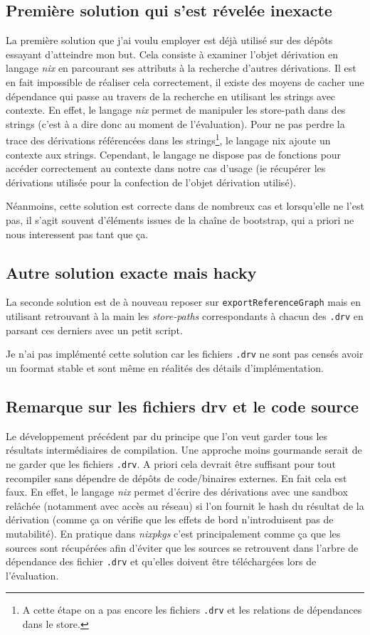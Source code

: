 \documentclass[a4paper,12pt]{article}
\begin{document}
\subsection{Première solution qui s'est révelée inexacte}

La première solution que j'ai voulu employer est déjà utilisé sur des dépôts
essayant d'atteindre mon but. Cela consiste à examiner l'objet dérivation en
langage \emph{nix} en parcourant ses attributs à la recherche d'autres
dérivations. Il est en fait impossible de réaliser cela correctement, il existe
des moyens de cacher une dépendance qui passe au travers de la recherche en
utilisant les strings avec contexte. En effet, le langage \emph{nix} permet de
manipuler les store-path dans des strings (c'est à a dire donc au moment de
l'évaluation). Pour ne pas perdre la trace des dérivations référencées dans les
strings\footnote{A cette étape on a pas encore les fichiers \texttt{.drv} et les
relations de dépendances dans le store.}, le langage nix ajoute un contexte aux
strings. Cependant, le langage ne dispose pas de fonctions pour accéder
correctement au contexte dans notre cas d'usage (ie récupérer les dérivations
utilisée pour la confection de l'objet dérivation utilisé).

Néanmoins, cette solution est correcte dans de nombreux cas et lorsqu'elle ne
l'est pas, il s'agit souvent d'éléments issues de la chaîne de bootstrap, qui a
priori ne nous interessent pas tant que ça.

\subsection{Autre solution exacte mais hacky}

La seconde solution est de à nouveau reposer sur \texttt{exportReferenceGraph}
mais en utilisant retrouvant à la main les \emph{store-paths} correspondants à
chacun des \texttt{.drv} en parsant ces derniers avec un petit script.

Je n'ai pas implémenté cette solution car les fichiers \texttt{.drv} ne sont pas
censés avoir un foormat stable et sont même en réalités des détails
d'implémentation.

\subsection{Remarque sur les fichiers drv et le code source}

Le développement précédent par du principe que l'on veut garder tous les
résultats intermédiaires de compilation. Une approche moins gourmande serait de
ne garder que les fichiers \texttt{.drv}. A priori cela devrait être suffisant
pour tout recompiler sans dépendre de dépôts de code/binaires externes. En fait
cela est faux. En effet, le langage \emph{nix} permet d'écrire des dérivations
avec une sandbox relâchée (notamment avec accès au réseau) si l'on fournit le
hash du résultat de la dérivation (comme ça on vérifie que les effets de bord
n'introduisent pas de mutabilité). En pratique dans \emph{nixpkgs} c'est
principalement comme ça que les sources sont récupérées afin d'éviter que les
sources se retrouvent dans l'arbre de dépendance des fichier \texttt{.drv} et
qu'elles doivent être téléchargées lors de l'évaluation.
\end{document}
